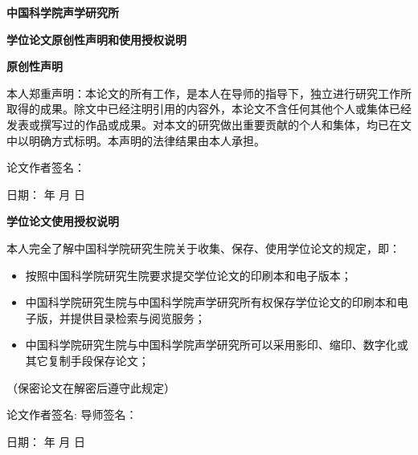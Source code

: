
\newpage
\thispagestyle{empty}

\begin{center}
   \xiaosan\textbf{中国科学院声学研究所}

    \textbf{学位论文原创性声明和使用授权说明}
\end{center}
\begin{center}
    \vspace{5mm}
    \sihao\textbf{ 原创性声明}
    \vspace{5mm}
\end{center}
\hspace{9mm}本人郑重声明：本论文的所有工作，是本人在导师的指导下，独立进行研究工作所取得的成果。除文中已经注明引用的内容外，本论文不含任何其他个人或集体已经发表或撰写过的作品或成果。对本文的研究做出重要贡献的个人和集体，均已在文中以明确方式标明。本声明的法律结果由本人承担。

\begin{flushright}
   \vspace{7mm}
   论文作者签名：\hspace{10em}

    日期：\hspace{4em} 年 \hspace{2em} 月 \hspace{2em}日
\end{flushright}
\begin{center}
    \vspace{5mm}
    \sihao\textbf{ 学位论文使用授权说明}
    \vspace{5mm}
\end{center}
\hspace{9mm}本人完全了解中国科学院研究生院关于收集、保存、使用学位论文的规定，即：
\begin{itemize}
    \item  按照中国科学院研究生院要求提交学位论文的印刷本和电子版本；
    \item  中国科学院研究生院与中国科学院声学研究所有权保存学位论文的印刷本和电子版，并提供目录检索与阅览服务；
    \item  中国科学院研究生院与中国科学院声学研究所可以采用影印、缩印、数字化或其它复制手段保存论文；
\end{itemize}
\begin{center}
    （保密论文在解密后遵守此规定）
\end{center}
\begin{flushright}
    \vspace{7mm}
    论文作者签名:\hspace{5em} 导师签名：\hspace{8em}

   日期：\hspace{4em} 年 \hspace{2em} 月 \hspace{2em}日
\end{flushright}
